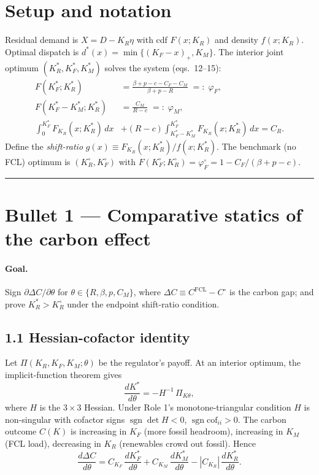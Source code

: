 \section*{Setup and notation}
Residual demand is $X=D-K_R\eta$ with cdf $F(x;K_R)$ and density $f(x;K_R)$.
Optimal dispatch is $d^*(x)=\min\{(K_F-x)_+,K_M\}$. The interior joint
optimum $(K_R^*,K_F^*,K_M^*)$ solves the system (eqs.\ 12--15):
\begin{align}
  F(K_F^*;K_R^*) &= \frac{\beta+p-c-C_F-C_M}{\beta+p-R} \;=:\; \varphi_F, \\
  F(K_F^*-K_M^*;K_R^*) &= \frac{C_M}{R-c} \;=:\; \varphi_M, \\
  \int_0^{K_F^*}\!\!F_{K_R}(x;K_R^*)\,dx
   &+ (R-c)\!\!\int_{K_F^*-K_M^*}^{K_F^*}\!\!F_{K_R}(x;K_R^*)\,dx = C_R.
\end{align}
Define the \emph{shift-ratio} $g(x)\equiv F_{K_R}(x;K_R^*)/f(x;K_R^*)$.
The benchmark (no FCL) optimum is $(K_R^\circ,K_F^\circ)$ with
$F(K_F^\circ;K_R^\circ)=\varphi_F^{\circ}=1-C_F/(\beta+p-c)$.

\bigskip
\hrule
\bigskip

\section{Bullet 1 --- Comparative statics of the carbon effect}

\paragraph{Goal.} Sign $\partial\Delta C/\partial\theta$ for
$\theta\in\{R,\beta,p,C_M\}$, where
$\Delta C \equiv C^{\mathrm{FCL}}-C^{\circ}$ is the carbon gap; and
prove $K_R^*>K_R^\circ$ under the endpoint shift-ratio condition.

\subsection*{1.1 Hessian-cofactor identity}
Let $\Pi(K_R,K_F,K_M;\theta)$ be the regulator's payoff. At an interior
optimum, the implicit-function theorem gives
\[
   \frac{d K^*}{d\theta} = -H^{-1}\,\Pi_{K\theta},
\]
where $H$ is the $3\times3$ Hessian. Under Role 1's monotone-triangular
condition $H$ is non-singular with cofactor signs
$\operatorname{sgn}\det H<0$, $\operatorname{sgn}\mathrm{cof}_{ii}>0$.
The carbon outcome $C(K)$ is increasing in $K_F$ (more fossil headroom),
increasing in $K_M$ (FCL load), decreasing in $K_R$ (renewables crowd out
fossil). Hence
\[
   \frac{d\Delta C}{d\theta}=
   C_{K_F}\,\frac{dK_F^*}{d\theta}+C_{K_M}\,\frac{dK_M^*}{d\theta}
   -|C_{K_R}|\,\frac{dK_R^*}{d\theta}.
\]

